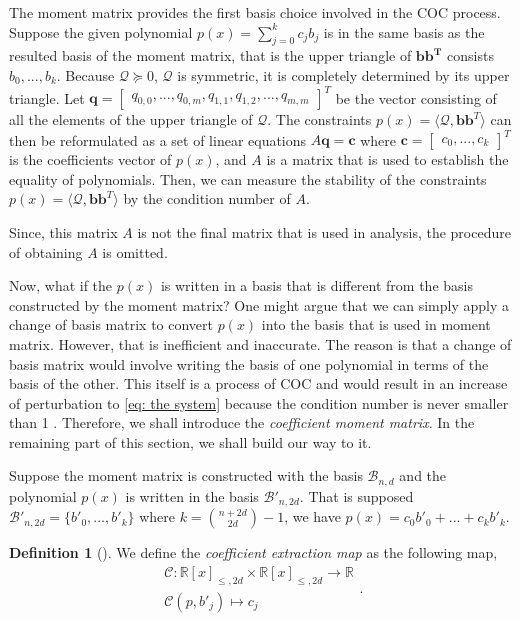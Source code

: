 \documentclass[12pt]{amsart}
\numberwithin{equation}{section}
\theoremstyle{definition}
\newtheorem{definition}[thm]{Definition}
\numberwithin{thm}{section}
\begin{document}
\smallskip
The moment matrix provides the first basis choice involved in the COC process. 
Suppose the given polynomial $p(x) = \sum_{j = 0} ^ k c_j b_j$ 
is in the same basis as the resulted basis of the moment matrix, 
that is the upper triangle of $\mathbf{bb^T}$ consists $b_0, ..., b_k$. 
Because $\mathcal{Q} \succcurlyeq 0$, $\mathcal{Q}$ is symmetric, 
it is completely determined by its upper triangle.
Let $\mathbf{q} = \begin{bmatrix} q_{0,0}, ..., q_{0, m}, q_{1,1}, q_{1, 2}, ..., q_{m, m} \end{bmatrix}^T$ 
be the vector consisting of all the elements of the upper triangle of $\mathcal{Q}$.
The constraints $p(x) = \langle \mathcal{Q}, \mathbf{bb}^T \rangle$ can then be reformulated as a set of linear equations 
$A \mathbf{q} = \mathbf{c}$ where $ \mathbf{c} = \begin{bmatrix}
     c_0, ..., c_k
\end{bmatrix}^T$ 
is the coefficients vector of $p(x)$, 
and $A$ is a matrix that is used to establish the equality of polynomials. 
Then, we can measure the stability of the constraints $p(x) = \langle \mathcal{Q}, \mathbf{bb}^T \rangle$ by the condition number of $A$. 

Since, this matrix $A$ is not the final matrix that is used in analysis, the procedure of obtaining $A$ is omitted. 

\smallskip

Now, what if the $p(x)$ is written in a basis that is different from the basis constructed by the moment matrix?
One might argue that we can simply apply a change of basis matrix to convert $p(x)$ into the basis that is used in moment matrix. 
However, that is inefficient and inaccurate. 
The reason is that a change of basis matrix would involve writing the basis of one polynomial in terms of the basis of the other. 
This itself is a process of COC and would result in an increase of perturbation to \eqref{eq: the system} because the condition number is never smaller than 1 \cite{golub1996matrix}.
Therefore, we shall introduce the \emph{coefficient moment matrix}. In the remaining part of this section, we shall build our way to it.

Suppose the moment matrix is constructed with the basis $\mathcal{B}_{n, d}$ and the polynomial $p(x)$ is written in the basis $\mathcal{B}'_{n, 2d}$. 
That is supposed $\mathcal{B}'_{n, 2d} = \{b'_0, ..., b'_k\}$ where $k = {n + 2d \choose 2d} - 1$, we have $p(x) = c_0b'_0 + ... + c_kb'_k$.
\begin{definition}[\cite{Recher:Masterthesis}]
     \label{def:cem}
We define the \emph{coefficient extraction map} as the following map,
\begin{equation*}
     \begin{split}
     \mathcal{C}: \mathbb{R}[x]_{\leq, 2d} \times \mathbb{R}[x]_{\leq, 2d} \rightarrow \mathbb{R} \\
     \mathcal{C}(p, b'_j) \mapsto c_j
     \end{split}.
\end{equation*}
\end{definition}
\end{document}
